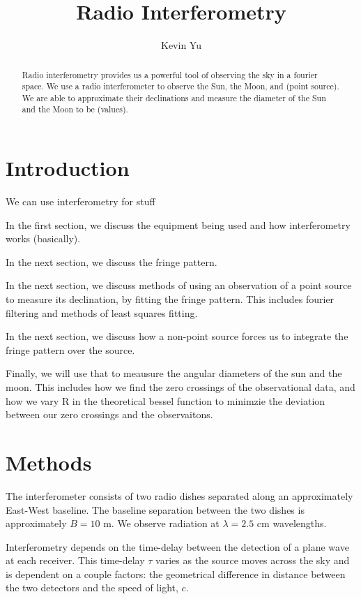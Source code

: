 \documentclass[12pt]{article}
\title{Radio Interferometry}
\author {
Kevin Yu
}
\begin{document}
\maketitle

\begin{abstract}
Radio interferometry provides us a powerful tool of observing the sky in a fourier space. We use a radio interferometer to observe the Sun, the Moon, and (point source). We are able to approximate their declinations and measure the diameter of the Sun and the Moon to be (values).
\end{abstract}

\section{Introduction}
We can use interferometry for stuff

In the first section, we discuss the equipment being used and how interferometry works (basically).

In the next section, we discuss the fringe pattern.

In the next section, we discuss methods of using an observation of a point source to measure its declination, by fitting the fringe pattern. This includes fourier filtering and methods of least squares fitting. 

In the next section, we discuss how a non-point source forces us to integrate the fringe pattern over the source.

Finally, we will use that to meausure the angular diameters of the sun and the moon. This includes how we find the zero crossings of the observational data, and how we vary R in the theoretical bessel function to minimzie the deviation between our zero crossings and the observaitons.

\section{Methods}
The interferometer consists of two radio dishes separated along an approximately East-West baseline. The baseline separation between the two dishes is approximately $B = 10$ m. We observe radiation at $\lambda = 2.5$ cm wavelengths.

Interferometry depends on the time-delay between the detection of a plane wave at each receiver. This time-delay $\tau$ varies as the source moves across the sky and is dependent on a couple factors: the geometrical difference in distance between the two detectors and the speed of light, $c$.
\end{document}
